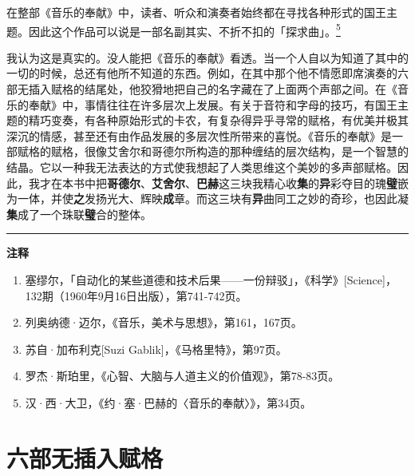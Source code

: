 \documentclass[
  12pt,
  twoside,
  openright,
  oldfontcommands,
]{memoir}
\newcommand{\heititext}[1]{{\heifamily\bfseries #1}}
\newenvironment{fsquote}{%
  \begin{mdframed}[style=gebquote]\kaitifamily\small%
}{%
  \end{mdframed}%
}
\begin{document}
\begin{fsquote}
在整部《音乐的奉献》中，读者、听众和演奏者始终都在寻找各种形式的国王主题。因此这个作品可以说是一部名副其实、不折不扣的「探求曲」。\hyperref[fn:Chapter20-5]{\textsuperscript{5}}
\end{fsquote}

我认为这是真实的。没人能把《音乐的奉献》看透。当一个人自以为知道了其中的一切的时候，总还有他所不知道的东西。例如，在其中那个他不情愿即席演奏的六部无插入赋格的结尾处，他狡猾地把自己的名字藏在了上面两个声部之间。在《音乐的奉献》中，事情往往在许多层次上发展。有关于音符和字母的技巧，有国王主题的精巧变奏，有各种原始形式的卡农，有复杂得异乎寻常的赋格，有优美并极其深沉的情感，甚至还有由作品发展的多层次性所带来的喜悦。《音乐的奉献》是一部赋格的赋格，很像艾舍尔和哥德尔所构造的那种缠结的层次结构，是一个智慧的结晶。它以一种我无法表达的方式使我想起了人类思维这个美妙的多声部赋格。因此，我才在本书中把\heititext{哥德尔}、\heititext{艾舍尔}、\heititext{巴赫}这三块我精心收\heititext{集}的\heititext{异}彩夺目的瑰\heititext{璧}嵌为一体，并使\heititext{之}发扬光大、辉映\heititext{成}章。而这三块有\heititext{异}曲同工之妙的奇珍，也因此凝\heititext{集}成了一个珠联\heititext{璧}合的整体。

{\footnotesize\setlength{\parindent}{0pt}%
\noindent\textcolor{rulegray}{\rule{0.35\linewidth}{0.3pt}}\par\vspace{2pt}
\noindent\textbf{注释}\par\vspace{3pt}
\begin{enumerate}
\label{fn:Chapter20-1}{}
\item 塞缪尔，「自动化的某些道德和技术后果——一份辩驳」，《科学》[Science]，132期（1960年9月16日出版），第741-742页。
\label{fn:Chapter20-2}{}
\item 列奥纳德·迈尔，《音乐，美术与思想》，第161，167页。
\label{fn:Chapter20-3}{}
\item 苏自·加布利克[Suzi Gablik]，《马格里特》，第97页。
\label{fn:Chapter20-4}{}
\item 罗杰·斯珀里，《心智、大脑与人道主义的价值观》，第78-83页。
\label{fn:Chapter20-5}{}
\item 汉·西·大卫，《约·塞·巴赫的〈音乐的奉献〉》，第34页。
\end{enumerate}
}

\label{Dialog21.xhtml}{}

\chapter*{六部无插入赋格}
\end{document}
